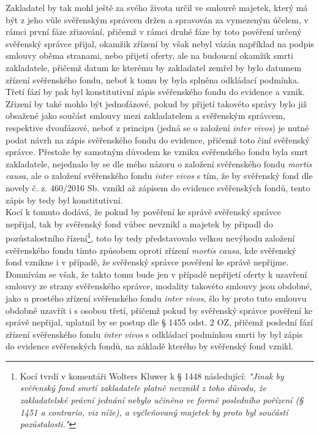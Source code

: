 \documentclass{article}
\begin{document}

Zakladatel by tak mohl ještě za svého života určil ve smlouvě majetek, který má být z jeho vůle svěřenským správcen držen a spravován za vymezeným účelem, v rámci první fáze zřizování, přičemž v rámci druhé fáze by toto pověření určený svěřenský správce přijal, okamžik zřízení by však nebyl vázán například na podpis smlouvy oběma stranami, nebo přijetí oferty, ale na budoucní okamžik smrti zakladatele, přičemž datum ke kterému by zakladatel zemřel by bylo datumem zřízení svěřenského fondu, neboť k tomu by byla splněna odkládací podmínka. Třetí fází by pak byl konstitutivní zápis svěřenského fondu do evidence a vznik.\\ 

Zřizení by také mohlo být jednofázové, pokud by přijetí takovéto správy bylo již obsažené jako součást smlouvy mezi zakladatelem a svěřenským správcem, respektive dvoufázové, neboť z principu (jedná se o založení \textit{inter vivos}) je nutné podat návrh na zápis svěřenského fondu do evidence, přičemž toto činí svěřenský správce. Přestože by samotným důvodem ke vzniku svěřenského fondu byla smrt zakladatele, nejednalo by se dle mého názoru o založení svěřenského fondu \textit{mortis causa}, ale o založení svěřenského fondu \textit{inter vivos} s tím, že by svěřenský fond dle novely č. z. 460/2016 Sb. vznikl až zápisem do evidence svěřenských fondů, tento zápis by tedy byl konstitutivní.\\

Kocí k tomuto dodává, že pokud by pověření ke správě svěřenský správce nepřijal, tak by svěřenský fond vůbec nevznikl a majetek by připadl do pozůstalostního řízení\footnote{Kocí tvrdí v komentáři Wolters Kluwer k § 1448 následující: \textit{"Jinak by svěřenský fond smrtí zakladatele platně nevznikl z toho důvodu, že zakladatelské právní jednání nebylo učiněno ve formě posledního pořízení (§ 1451 a contrario, viz níže), a vyčleňovaný majetek by proto byl součástí pozůstalosti."}}, toto by tedy představovalo velkou nevýhodu založení svěřenského fondu tímto způsobem oproti zřízení \textit{mortis causa}, kde svěřenský fond vznikne i v případě, že svěřenský správce pověření ke správě nepřijme. Domnívám se však, že takto tomu bude jen v případě nepřijetí oferty k uzavření smlouvy ze strany svěřenského správce, modality takovéto smlouvy jsou obdobné, jako u prostého zřízení svěřenského fondu \textit{inter vivos}, šlo by proto tuto smlouvu obdobně uzavřít i s osobou třetí, přičemž pokud by svěřenský správce pověření ke správě nepřijal, uplatnil by se postup dle § 1455 odst. 2 OZ, přičemž poslední fází zřízení svěřenského fondu \textit{inter vivos} s odkládací podmínkou smrti by byl zápis do evidence svěřenských fondů, na základě kterého by svěřenský fond vznikl.\\
\end{document}
